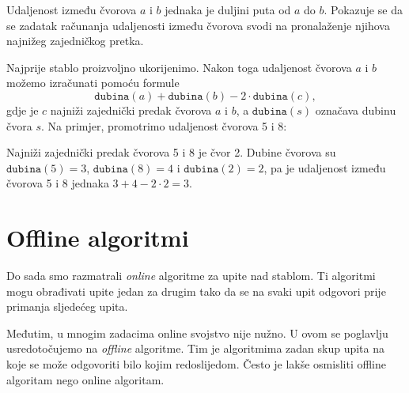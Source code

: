 Udaljenost između čvorova $a$ i $b$
jednaka je duljini puta od $a$ do $b$.
Pokazuje se da se zadatak računanja
udaljenosti između čvorova svodi na
pronalaženje njihova najnižeg zajedničkog pretka.

Najprije stablo proizvoljno ukorijenimo.
Nakon toga udaljenost čvorova $a$ i $b$
možemo izračunati pomoću formule
\[\texttt{dubina}(a)+\texttt{dubina}(b)-2 \cdot \texttt{dubina}(c),\]
gdje je $c$ najniži zajednički predak čvorova $a$ i $b$,
a $\texttt{dubina}(s)$ označava dubinu čvora $s$.
Na primjer, promotrimo udaljenost čvorova 5 i 8:
\begin{center}
\end{center}

Najniži zajednički predak čvorova 5 i 8 je čvor 2.
Dubine čvorova su
$\texttt{dubina}(5)=3$, $\texttt{dubina}(8)=4$ i $\texttt{dubina}(2)=2$,
pa je udaljenost između čvorova 5 i 8 jednaka
$3+4-2\cdot2=3$.

\section{Offline algoritmi}

Do sada smo razmatrali \emph{online} algoritme
za upite nad stablom.
Ti algoritmi mogu obrađivati
upite jedan za drugim tako da se
na svaki upit odgovori prije primanja sljedećeg upita.

Međutim, u mnogim zadacima online
svojstvo nije nužno.
U ovom se poglavlju usredotočujemo na \emph{offline} algoritme.
Tim je algoritmima zadan skup upita na koje se
može odgovoriti bilo kojim redoslijedom.
Često je lakše osmisliti offline algoritam
nego online algoritam.

